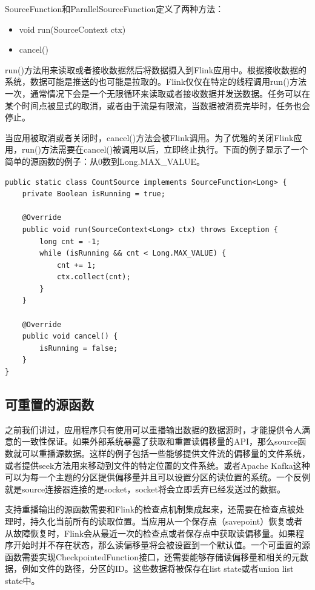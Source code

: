 \documentclass[cn,11pt,chinese]{elegantbook}
\begin{document}
SourceFunction和ParallelSourceFunction定义了两种方法：

\begin{itemize}
    \item void run(SourceContext ctx)
    \item cancel()
\end{itemize}

run()方法用来读取或者接收数据然后将数据摄入到Flink应用中。根据接收数据的系统，数据可能是推送的也可能是拉取的。Flink仅仅在特定的线程调用run()方法一次，通常情况下会是一个无限循环来读取或者接收数据并发送数据。任务可以在某个时间点被显式的取消，或者由于流是有限流，当数据被消费完毕时，任务也会停止。

当应用被取消或者关闭时，cancel()方法会被Flink调用。为了优雅的关闭Flink应用，run()方法需要在cancel()被调用以后，立即终止执行。下面的例子显示了一个简单的源函数的例子：从0数到Long.MAX\_VALUE。

\begin{verbatim}
public static class CountSource implements SourceFunction<Long> {
    private Boolean isRunning = true;

    @Override
    public void run(SourceContext<Long> ctx) throws Exception {
        long cnt = -1;
        while (isRunning && cnt < Long.MAX_VALUE) {
            cnt += 1;
            ctx.collect(cnt);
        }
    }

    @Override
    public void cancel() {
        isRunning = false;
    }
}
\end{verbatim}

\subsection{可重置的源函数}

之前我们讲过，应用程序只有使用可以重播输出数据的数据源时，才能提供令人满意的一致性保证。如果外部系统暴露了获取和重置读偏移量的API，那么source函数就可以重播源数据。这样的例子包括一些能够提供文件流的偏移量的文件系统，或者提供seek方法用来移动到文件的特定位置的文件系统。或者Apache Kafka这种可以为每一个主题的分区提供偏移量并且可以设置分区的读位置的系统。一个反例就是source连接器连接的是socket，socket将会立即丢弃已经发送过的数据。

支持重播输出的源函数需要和Flink的检查点机制集成起来，还需要在检查点被处理时，持久化当前所有的读取位置。当应用从一个保存点（savepoint）恢复或者从故障恢复时，Flink会从最近一次的检查点或者保存点中获取读偏移量。如果程序开始时并不存在状态，那么读偏移量将会被设置到一个默认值。一个可重置的源函数需要实现CheckpointedFunction接口，还需要能够存储读偏移量和相关的元数据，例如文件的路径，分区的ID。这些数据将被保存在list state或者union list state中。
\end{document}
